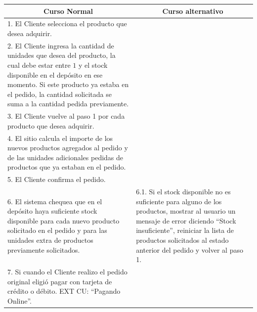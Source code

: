 \begin{center}
\begin{tabular}{|p{}|p{}|}
    \hline
    \multicolumn{1}{|c|}{Curso Normal} &
    \multicolumn{1}{|c|}{Curso alternativo} \\
    \hline
	1. El Cliente selecciona el producto que desea adquirir. & \\
	2. El Cliente ingresa la cantidad de unidades que desea del producto, la cual debe estar entre $1$ y el stock disponible en el depósito en ese momento. Si este producto ya estaba en el pedido, la cantidad solicitada se suma a la cantidad pedida previamente. & \\
	3. El Cliente vuelve al paso 1 por cada producto que desea adquirir. & \\
	4. El sitio calcula el importe de los nuevos productos agregados al pedido y de las unidades adicionales pedidas de productos que ya estaban en el pedido. & \\
	5. El Cliente confirma el pedido. & \\
	6. El sistema chequea que en el depósito haya suficiente stock disponible para cada nuevo producto solicitado en el pedido y para las unidades extra de productos previamente solicitados. &
	6.1. Si el stock disponible no es suficiente para alguno de los productos, mostrar al usuario un mensaje de error diciendo ``Stock insuficiente'', reiniciar la lista de productos solicitados al estado anterior del pedido y volver al paso 1. \\
	7. Si cuando el Cliente realizo el pedido original eligió pagar con tarjeta de crédito o débito. EXT CU: ``Pagando Online''. & \\
\end{tabular}
\end{center}

